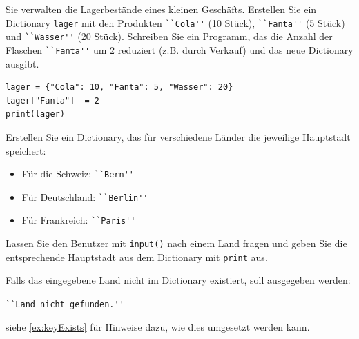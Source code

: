 \begin{myexercise}
	Sie verwalten die Lagerbestände eines kleinen Geschäfts. Erstellen Sie ein Dictionary \lstinline|lager| mit den Produkten \lstinline|``Cola''| (10 Stück), \lstinline|``Fanta''| (5 Stück) und \lstinline|``Wasser''| (20 Stück). Schreiben Sie ein Programm, das die Anzahl der Flaschen \lstinline|``Fanta''| um 2 reduziert (z.B. durch Verkauf) und das neue Dictionary ausgibt.

	\begin{myanswer}
		\begin{lstlisting}
lager = {"Cola": 10, "Fanta": 5, "Wasser": 20}
lager["Fanta"] -= 2
print(lager)
\end{lstlisting}
	\end{myanswer}
\end{myexercise}

\begin{myexercise}
	Erstellen Sie ein Dictionary, das für verschiedene Länder die jeweilige Hauptstadt speichert:
	\begin{itemize}
		\item Für die Schweiz: \lstinline|``Bern''|
		\item Für Deutschland: \lstinline|``Berlin''|
		\item Für Frankreich: \lstinline|``Paris''|
	\end{itemize}

	Lassen Sie den Benutzer mit \lstinline|input()| nach einem Land fragen und geben Sie die entsprechende Hauptstadt aus dem Dictionary mit \lstinline|print| aus.

	Falls das eingegebene Land nicht im Dictionary existiert, soll ausgegeben werden:

	\lstinline|``Land nicht gefunden.''|

	siehe \cref{ex:keyExists} für Hinweise dazu, wie dies umgesetzt werden kann.

	\begin{myanswer}
		
	\end{myanswer}
\end{myexercise}

